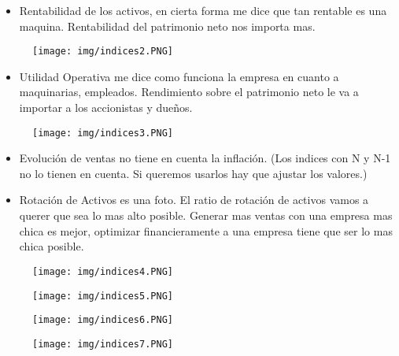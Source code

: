 \documentclass[titlepage,a4paper]{article}
\begin{document}
\begin{itemize}
\item Rentabilidad de los activos, en cierta forma me dice que tan rentable es una maquina. Rentabilidad del patrimonio neto nos importa mas.
\end{itemize}
\begin{figure}[!htb]
    \centering
    \texttt{[image: img/indices2.PNG]}
\end{figure}

\begin{itemize}
\item Utilidad Operativa me dice como funciona la empresa en cuanto a maquinarias, empleados. Rendimiento sobre el patrimonio neto le va a importar a los accionistas y dueños.
\end{itemize}
\begin{figure}[!htb]
    \centering
    \texttt{[image: img/indices3.PNG]}
\end{figure}
\begin{itemize}
\item Evolución de ventas no tiene en cuenta la inflación. (Los indices con N y N-1 no lo tienen en cuenta. Si queremos usarlos hay que ajustar los valores.)
\item Rotación de Activos es una foto. El ratio de rotación de activos vamos a querer que sea lo mas alto posible. Generar mas ventas con una empresa mas chica es mejor, optimizar financieramente a una empresa tiene que ser lo mas chica posible.
\end{itemize}

\begin{figure}[!htb]
    \centering
    \texttt{[image: img/indices4.PNG]}
\end{figure}

\begin{figure}[!htb]
    \centering
    \texttt{[image: img/indices5.PNG]}
\end{figure}

\begin{figure}[!htb]
    \centering
    \texttt{[image: img/indices6.PNG]}
\end{figure}

\begin{figure}[!htb]
    \centering
    \texttt{[image: img/indices7.PNG]}
\end{figure}
\end{document}
